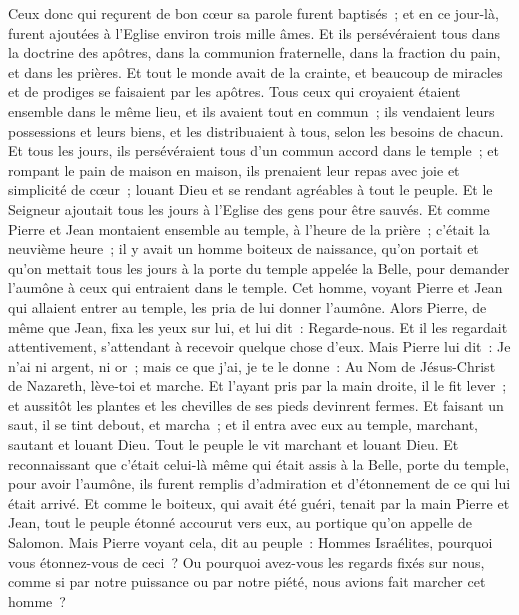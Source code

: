 \begin{multicols}{2}
Ceux donc qui reçurent de bon cœur sa parole furent baptisés~; et en ce jour-là, furent ajoutées à l'Eglise environ trois mille âmes.
Et ils persévéraient tous dans la doctrine des apôtres, dans la communion fraternelle, dans la fraction du pain, et dans les prières.
Et tout le monde avait de la crainte, et beaucoup de miracles et de prodiges se faisaient par les apôtres.
Tous ceux qui croyaient étaient ensemble dans le même lieu, et ils avaient tout en commun~;
ils vendaient leurs possessions et leurs biens, et les distribuaient à tous, selon les besoins de chacun.
Et tous les jours, ils persévéraient tous d'un commun accord dans le temple~; et rompant le pain de maison en maison, ils prenaient leur repas avec joie et simplicité de cœur~;
louant Dieu et se rendant agréables à tout le peuple. Et le Seigneur ajoutait tous les jours à l'Eglise des gens pour être sauvés.
\VerseOne{}Et comme Pierre et Jean montaient ensemble au temple, à l'heure de la prière~; c'était la neuvième heure~;
il y avait un homme boiteux de naissance, qu'on portait et qu'on mettait tous les jours à la porte du temple appelée la Belle, pour demander l'aumône à ceux qui entraient dans le temple.
Cet homme, voyant Pierre et Jean qui allaient entrer au temple, les pria de lui donner l'aumône.
Alors Pierre, de même que Jean, fixa les yeux sur lui, et lui dit~: Regarde-nous.
Et il les regardait attentivement, s'attendant à recevoir quelque chose d'eux.
Mais Pierre lui dit~: Je n'ai ni argent, ni or~; mais ce que j'ai, je te le donne~: Au Nom de Jésus-Christ de Nazareth, lève-toi et marche.
Et l'ayant pris par la main droite, il le fit lever~; et aussitôt les plantes et les chevilles de ses pieds devinrent fermes.
Et faisant un saut, il se tint debout, et marcha~; et il entra avec eux au temple, marchant, sautant et louant Dieu.
Tout le peuple le vit marchant et louant Dieu.
Et reconnaissant que c'était celui-là même qui était assis à la Belle, porte du temple, pour avoir l'aumône, ils furent remplis d'admiration et d'étonnement de ce qui lui était arrivé.
Et comme le boiteux, qui avait été guéri, tenait par la main Pierre et Jean, tout le peuple étonné accourut vers eux, au portique qu'on appelle de Salomon.
Mais Pierre voyant cela, dit au peuple~: Hommes Israélites, pourquoi vous étonnez-vous de ceci~? Ou pourquoi avez-vous les regards fixés sur nous, comme si par notre puissance ou par notre piété, nous avions fait marcher cet homme~?

\end{multicols}
